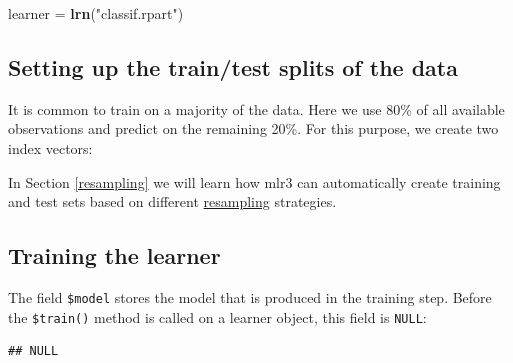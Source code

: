 \documentclass[]{scrbook}
\newenvironment{Shaded}{\begin{snugshade}}{\end{snugshade}}
\newcommand{\FloatTok}[1]{\textcolor[rgb]{0.00,0.00,0.81}{#1}}
\newcommand{\KeywordTok}[1]{\textcolor[rgb]{0.13,0.29,0.53}{\textbf{#1}}}
\newcommand{\NormalTok}[1]{#1}
\newcommand{\OperatorTok}[1]{\textcolor[rgb]{0.81,0.36,0.00}{\textbf{#1}}}
\newcommand{\StringTok}[1]{\textcolor[rgb]{0.31,0.60,0.02}{#1}}
\renewenvironment{Shaded} {\begin{snugshade}\small} {\end{snugshade}}
\begin{document}
\begin{Shaded}
\begin{Highlighting}[]
\NormalTok{learner =}\StringTok{ }\KeywordTok{lrn}\NormalTok{(}\StringTok{"classif.rpart"}\NormalTok{)}
\end{Highlighting}
\end{Shaded}

\hypertarget{split-data}{%
\subsection{Setting up the train/test splits of the data}\label{split-data}}

It is common to train on a majority of the data.
Here we use 80\% of all available observations and predict on the remaining 20\%.
For this purpose, we create two index vectors:

\begin{Shaded}
\end{Shaded}

In Section \ref{resampling} we will learn how mlr3 can automatically create training and test sets based on different \protect\hyperlink{resampling}{resampling} strategies.

\hypertarget{training}{%
\subsection{Training the learner}\label{training}}

The field \texttt{\$model} stores the model that is produced in the training step.
Before the \texttt{\$train()} method is called on a learner object, this field is \texttt{NULL}:

\begin{Shaded}
\end{Shaded}

\begin{verbatim}
## NULL
\end{verbatim}
\end{document}
